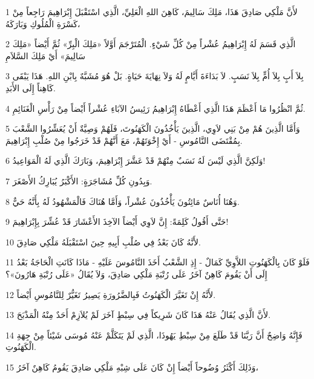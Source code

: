 \par 1 لأَنَّ مَلْكِي صَادِقَ هَذَا، مَلِكَ سَالِيمَ، كَاهِنَ اللهِ الْعَلِيِّ، الَّذِي اسْتَقْبَلَ إِبْرَاهِيمَ رَاجِعاً مِنْ كَسْرَةِ الْمُلُوكِ وَبَارَكَهُ،
\par 2 الَّذِي قَسَمَ لَهُ إِبْرَاهِيمُ عُشْراً مِنْ كُلِّ شَيْءٍ. الْمُتَرْجَمَ أَوَّلاً «مَلِكَ الْبِرِّ» ثُمَّ أَيْضاً «مَلِكَ سَالِيمَ» أَيْ مَلِكَ السَّلاَمِ
\par 3 بِلاَ أَبٍ بِلاَ أُمٍّ بِلاَ نَسَبٍ. لاَ بَدَاءَةَ أَيَّامٍ لَهُ وَلاَ نِهَايَةَ حَيَاةٍ. بَلْ هُوَ مُشَبَّهٌ بِابْنِ اللهِ. هَذَا يَبْقَى كَاهِناً إِلَى الأَبَدِ.
\par 4 ثُمَّ انْظُرُوا مَا أَعْظَمَ هَذَا الَّذِي أَعْطَاهُ إِبْرَاهِيمُ رَئِيسُ الآبَاءِ عُشْراً أَيْضاً مِنْ رَأْسِ الْغَنَائِمِ.
\par 5 وَأَمَّا الَّذِينَ هُمْ مِنْ بَنِي لاَوِي، الَّذِينَ يَأْخُذُونَ الْكَهَنُوتَ، فَلَهُمْ وَصِيَّةٌ أَنْ يُعَشِّرُوا الشَّعْبَ بِمُقْتَضَى النَّامُوسِ - أَيْ إِخْوَتَهُمْ، مَعَ أَنَّهُمْ قَدْ خَرَجُوا مِنْ صُلْبِ إِبْرَاهِيمَ.
\par 6 وَلَكِنَّ الَّذِي لَيْسَ لَهُ نَسَبٌ مِنْهُمْ قَدْ عَشَّرَ إِبْرَاهِيمَ، وَبَارَكَ الَّذِي لَهُ الْمَوَاعِيدُ!
\par 7 وَبِدُونِ كُلِّ مُشَاجَرَةٍ: الأَكْبَرُ يُبَارِكُ الأَصْغَرَ.
\par 8 وَهُنَا أُنَاسٌ مَائِتُونَ يَأْخُذُونَ عُشْراً، وَأَمَّا هُنَاكَ فَالْمَشْهُودُ لَهُ بِأَنَّهُ حَيٌّ.
\par 9 حَتَّى أَقُولُ كَلِمَةً: إِنَّ لاَوِي أَيْضاً الآخِذَ الأَعْشَارَ قَدْ عُشِّرَ بِإِبْرَاهِيمَ!
\par 10 لأَنَّهُ كَانَ بَعْدُ فِي صُلْبِ أَبِيهِ حِينَ اسْتَقْبَلَهُ مَلْكِي صَادِقَ.
\par 11 فَلَوْ كَانَ بِالْكَهَنُوتِ اللاَّوِيِّ كَمَالٌ - إِذِ الشَّعْبُ أَخَذَ النَّامُوسَ عَلَيْهِ - مَاذَا كَانَتِ الْحَاجَةُ بَعْدُ إِلَى أَنْ يَقُومَ كَاهِنٌ آخَرُ عَلَى رُتْبَةِ مَلْكِي صَادِقَ، وَلاَ يُقَالُ «عَلَى رُتْبَةِ هَارُونَ»؟
\par 12 لأَنَّهُ إِنْ تَغَيَّرَ الْكَهَنُوتُ فَبِالضَّرُورَةِ يَصِيرُ تَغَيُّرٌ لِلنَّامُوسِ أَيْضاً.
\par 13 لأَنَّ الَّذِي يُقَالُ عَنْهُ هَذَا كَانَ شَرِيكاً فِي سِبْطٍ آخَرَ لَمْ يُلاَزِمْ أَحَدٌ مِنْهُ الْمَذْبَحَ.
\par 14 فَإِنَّهُ وَاضِحٌ أَنَّ رَبَّنَا قَدْ طَلَعَ مِنْ سِبْطِ يَهُوذَا، الَّذِي لَمْ يَتَكَلَّمْ عَنْهُ مُوسَى شَيْئاً مِنْ جِهَةِ الْكَهَنُوتِ.
\par 15 وَذَلِكَ أَكْثَرُ وُضُوحاً أَيْضاً إِنْ كَانَ عَلَى شِبْهِ مَلْكِي صَادِقَ يَقُومُ كَاهِنٌ آخَرُ،

